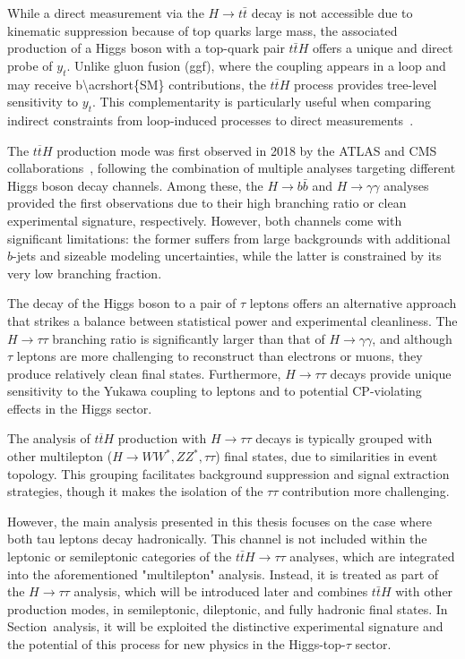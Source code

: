 \documentclass[11pt,twoside]{book}
\newcommand*{\ttH}{\ensuremath{t\overline{t}H}\xspace}
\begin{document}
While a direct measurement via the $H\to t\bar{t}$ decay is not accessible due to kinematic suppression because of top quarks large mass, the associated production of a Higgs boson with a top-quark pair $t\bar{t}H$ offers a unique and direct probe of $y_t$. Unlike gluon fusion (\acrshort{ggf}), where the coupling appears in a loop and may receive \acrshort{b\acrshort{SM}} contributions, the \ttH process provides tree-level sensitivity to $y_t$. This complementarity is particularly useful when comparing indirect constraints from loop-induced processes to direct measurements~\cite{Ng:1983jm,Kunszt:1984ri,Beenakker:2001rj}.

The \ttH production mode was first observed in 2018 by the ATLAS and CMS collaborations~\cite{ATLAS:2018mme,CMS:2018uxb}, following the combination of multiple analyses targeting different Higgs boson decay channels. Among these, the $H\to b \bar{b}$ and $H\to \gamma \gamma$ analyses provided the first observations due to their high branching ratio or clean experimental signature, respectively. However, both channels come with significant limitations: the former suffers from large backgrounds with additional $b$-jets and sizeable modeling uncertainties, while the latter is constrained by its very low branching fraction.

The decay of the Higgs boson to a pair of $\tau$ leptons offers an alternative approach that strikes a balance between statistical power and experimental cleanliness. The $H\to\tau\tau$ branching ratio is significantly larger than that of $H\to \gamma \gamma$, and although $\tau$ leptons are more challenging to reconstruct than electrons or muons, they produce relatively clean final states. Furthermore, $H\to\tau\tau$ decays provide unique sensitivity to the Yukawa coupling to leptons and to potential CP-violating effects in the Higgs sector.

The analysis of \ttH production with $H\to\tau\tau$ decays is typically grouped with other multilepton ($H\to WW^*, ZZ^*, \tau\tau$) final states, due to similarities in event topology. This grouping facilitates background suppression and signal extraction strategies, though it makes the isolation of the $\tau\tau$ contribution more challenging. 

However, the main analysis presented in this thesis focuses on the case where both tau leptons decay hadronically. This channel is not included within the leptonic or semileptonic categories of the $t\bar{t}H \to \tau\tau$ analyses, which are integrated into the aforementioned "multilepton" analysis. Instead, it is treated as part of the $H \to \tau\tau$ analysis, which will be introduced later and combines $t\bar{t}H$ with other production modes, in semileptonic, dileptonic, and fully hadronic final states. In Section~{analysis}, it will be exploited the distinctive experimental signature and the potential of this process for new physics in the Higgs-top-$\tau$ sector.
\end{document}

